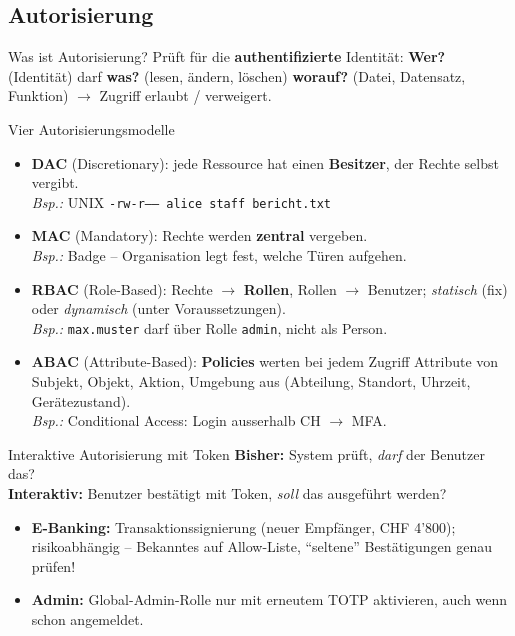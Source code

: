 \documentclass[a4paper, fontsize=7pt]{scrartcl}
\begin{document}
\subsection{Autorisierung}

\begin{mainbox}{Was ist Autorisierung?}
Prüft für die \textbf{authentifizierte} Identität:
\textbf{Wer?} (Identität) darf \textbf{was?} (lesen, ändern, löschen)
\textbf{worauf?} (Datei, Datensatz, Funktion) $\to$ Zugriff erlaubt /
verweigert.
\end{mainbox}

\begin{mainbox}{Vier Autorisierungsmodelle}
\begin{itemize}
    \item \textbf{DAC} (Discretionary): jede Ressource hat einen
          \textbf{Besitzer}, der Rechte selbst vergibt.\\
          \emph{Bsp.:} UNIX \texttt{-rw-r----- alice staff bericht.txt}
    \item \textbf{MAC} (Mandatory): Rechte werden \textbf{zentral} vergeben.\\
          \emph{Bsp.:} Badge -- Organisation legt fest, welche Türen
          aufgehen.
    \item \textbf{RBAC} (Role-Based): Rechte $\to$ \textbf{Rollen},
          Rollen $\to$ Benutzer; \emph{statisch} (fix) oder
          \emph{dynamisch} (unter Voraussetzungen).\\
          \emph{Bsp.:} \texttt{max.muster} darf über Rolle \texttt{admin},
          nicht als Person.
    \item \textbf{ABAC} (Attribute-Based): \textbf{Policies} werten bei
          jedem Zugriff Attribute von Subjekt, Objekt, Aktion, Umgebung
          aus (Abteilung, Standort, Uhrzeit, Gerätezustand).\\
          \emph{Bsp.:} Conditional Access: Login ausserhalb CH $\to$ MFA.
\end{itemize}
\end{mainbox}

\begin{subbox}{Interaktive Autorisierung mit Token}
\textbf{Bisher:} System prüft, \emph{darf} der Benutzer das?\\
\textbf{Interaktiv:} Benutzer bestätigt mit Token, \emph{soll} das
ausgeführt werden?
\begin{itemize}
    \item \textbf{E-Banking:} Transaktionssignierung (neuer Empfänger,
          CHF 4'800); risikoabhängig -- Bekanntes auf Allow-Liste, ``seltene''
          Bestätigungen genau prüfen!
    \item \textbf{Admin:} Global-Admin-Rolle nur mit erneutem TOTP aktivieren,
          auch wenn schon angemeldet.
\end{itemize}
\end{subbox}
\end{document}
